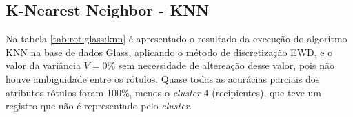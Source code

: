 \subsection{K-Nearest Neighbor - KNN} \label{cap:resultados:ssec:glass:knn}


Na tabela \ref{tab:rot:glass:knn} é apresentado o resultado da execução do algoritmo KNN na base de dados Glass, aplicando o método de discretização EWD, e o valor da variância ${V=0\%}$ sem necessidade de altereação desse valor, pois não houve ambiguidade entre os rótulos. Quase todas as acurácias parciais dos atributos rótulos foram 100\%, menos o \textit{cluster} 4 (recipientes), que teve um registro que não é representado pelo \textit{cluster}.

\newpage
\begin{table}[!h]
\centering
\caption{Resultado da aplicação do algoritmo KNN}
\label{tab:rot:glass:knn}
\end{table}
